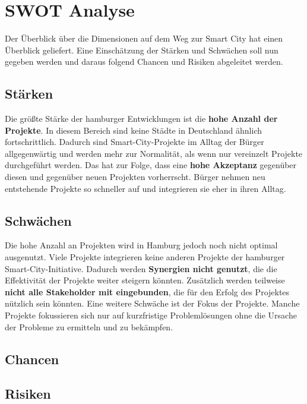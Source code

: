\section{SWOT Analyse}

Der Überblick über die Dimensionen auf dem Weg zur Smart City hat einen Überblick geliefert. Eine Einschätzung der Stärken und Schwächen soll nun gegeben werden und daraus folgend Chancen und Risiken abgeleitet werden.
\subsection{Stärken}

Die größte Stärke der hamburger Entwicklungen ist die \textbf{hohe Anzahl der Projekte}. In diesem Bereich sind keine Städte in Deutschland ähnlich fortschrittlich. Dadurch sind Smart-City-Projekte im Alltag der Bürger allgegenwärtig und werden mehr zur Normalität, als wenn nur vereinzelt Projekte durchgeführt werden. Das hat zur Folge, dass eine \textbf{hohe Akzeptanz }gegenüber diesen und gegenüber neuen Projekten vorherrscht. Bürger nehmen neu entstehende Projekte so schneller auf und integrieren sie eher in ihren Alltag.

\subsection{Schwächen}

Die hohe Anzahl an Projekten wird in Hamburg jedoch noch nicht optimal ausgenutzt. Viele Projekte integrieren keine anderen Projekte der hamburger Smart-City-Initiative. Dadurch werden \textbf{Synergien nicht genutzt}, die die Effektivität der Projekte weiter steigern könnten. Zusätzlich werden teilweise \textbf{nicht alle Stakeholder mit eingebunden}, die für den Erfolg des Projektes nützlich sein könnten. Eine weitere Schwäche ist der Fokus der Projekte. Manche Projekte fokussieren sich nur auf kurzfristige Problemlösungen ohne die Ursache der Probleme zu ermitteln und zu bekämpfen.

\subsection{Chancen}



\subsection{Risiken}

